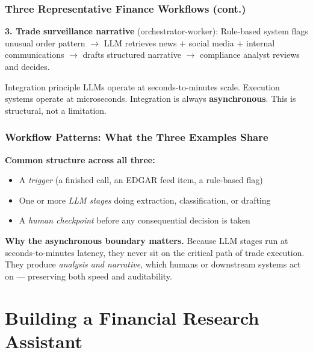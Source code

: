 \documentclass[9pt,t]{beamer}
\begin{document}
\begin{frame}
\frametitle{Three Representative Finance Workflows (cont.)}

\textbf{3. Trade surveillance narrative} (orchestrator-worker):
Rule-based system flags unusual order pattern $\to$ LLM retrieves news + social media + internal communications $\to$ drafts structured narrative $\to$ compliance analyst reviews and decides.

\medskip
\begin{alertblock}{Integration principle}
  LLMs operate at seconds-to-minutes scale. Execution systems operate at microseconds.
  Integration is always \textbf{asynchronous}. This is structural, not a limitation.
\end{alertblock}
\end{frame}

\begin{frame}
\frametitle{Workflow Patterns: What the Three Examples Share}

\textbf{Common structure across all three:}
\begin{itemize}
  \item A \emph{trigger} (a finished call, an EDGAR feed item, a rule-based flag)
  \item One or more \emph{LLM stages} doing extraction, classification, or drafting
  \item A \emph{human checkpoint} before any consequential decision is taken
\end{itemize}

\medskip
\textbf{Why the asynchronous boundary matters.} Because LLM stages run at
seconds-to-minutes latency, they never sit on the critical path of trade
execution. They produce \emph{analysis and narrative}, which humans or
downstream systems act on --- preserving both speed and auditability.
\end{frame}

\section{Building a Financial Research Assistant}
\end{document}

